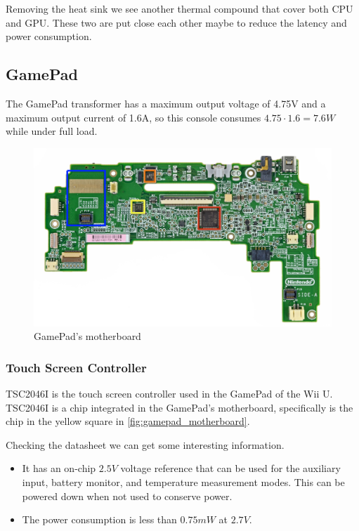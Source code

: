 \documentclass[11pt,a4paper,titlepage]{article}
\begin{document}
						Removing the heat sink we see another thermal compound that cover both CPU and GPU. These two are put close each other maybe to reduce the latency and power consumption.

					\subsection{GamePad}
						The GamePad transformer has a maximum output voltage of 4.75V and a maximum output current of 1.6A, so this console consumes $4.75\cdot 1.6 = 7.6W$ while under full load.
						\begin{figure}[htbp]
							\includegraphics[width=\textwidth]{gamepad_motherboard_front.png}
							\caption{GamePad's motherboard}
							\label{fig:gamepad_motherboard}
						\end{figure}
						\subsubsection{Touch Screen Controller}
							TSC2046I is the touch screen controller used in the GamePad of the Wii U. TSC2046I is a chip integrated in the GamePad's motherboard, specifically is the chip in the yellow square in \autoref{fig:gamepad_motherboard}.

							Checking the datasheet \cite{touchscreen} we can get some interesting information.
							\begin{itemize}
								\item It has an on-chip $2.5V$ voltage reference that can be used for the auxiliary input, battery monitor, and temperature measurement modes. This can be powered down when not used to conserve power.
								\item The power consumption is less than $0.75mW$ at $2.7V$.
							\end{itemize}
\end{document}
